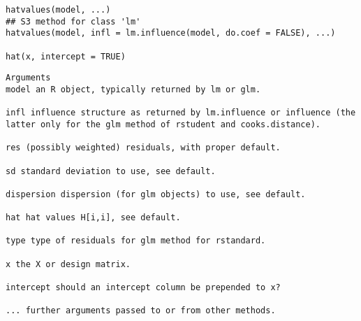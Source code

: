 \documentclass[residuals.tex]{subfiles}
\begin{document}
\begin{framed}
	\begin{verbatim}
hatvalues(model, ...)
## S3 method for class 'lm'
hatvalues(model, infl = lm.influence(model, do.coef = FALSE), ...)

hat(x, intercept = TRUE)

\end{verbatim}
\end{framed}
\begin{verbatim}
Arguments
model an R object, typically returned by lm or glm.
 
infl influence structure as returned by lm.influence or influence (the latter only for the glm method of rstudent and cooks.distance).
 
res (possibly weighted) residuals, with proper default.
 
sd standard deviation to use, see default.
 
dispersion dispersion (for glm objects) to use, see default.
 
hat hat values H[i,i], see default.
 
type type of residuals for glm method for rstandard.
 
x the X or design matrix.
 
intercept should an intercept column be prepended to x?
 
... further arguments passed to or from other methods.

\end{verbatim}

\newpage
 
\end{document}
